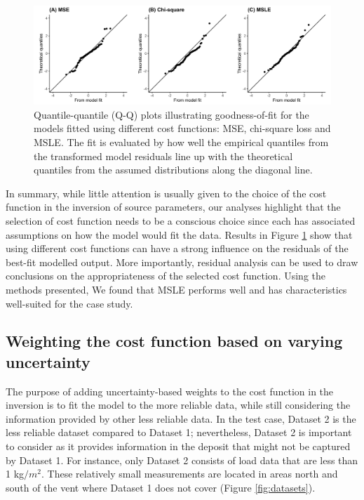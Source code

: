     \begin{figure}[tbp]
    \centering
    \includegraphics[width=\linewidth]{Figures/fig5_qq-plots.png}
    \caption{Quantile-quantile (Q-Q) plots illustrating goodness-of-fit for the models fitted using different cost functions: MSE, chi-square loss and MSLE. The fit is evaluated by how well the empirical quantiles from the transformed model residuals line up with the theoretical quantiles from the assumed distributions along the diagonal line.}
    \label{fig:gaussian_qq}
    \end{figure}

In summary, while little attention is usually given to the choice of the cost function in the inversion of source parameters, our analyses highlight that the selection of cost function needs to be a conscious choice since each has associated assumptions on how the model would fit the data. Results in Figure \ref{fig:gaussian_qq} show that using different cost functions can have a strong influence on the residuals of the best-fit modelled output. More importantly, residual analysis can be used to draw conclusions on the appropriateness of the selected cost function. Using the methods presented, We found that MSLE performs well and has characteristics well-suited for the case study. 

\subsection{Weighting the cost function based on varying uncertainty} \label{subsection-varuncert}

The purpose of adding uncertainty-based weights to the cost function in the inversion is to fit the model to the more reliable data, while still considering the information provided by other less reliable data. In the test case, Dataset 2 is the less reliable dataset compared to Dataset 1; nevertheless, Dataset 2 is important to consider as it provides information in the deposit that might not be captured by Dataset 1. For instance, only Dataset 2 consists of load data that are less than 1 kg$/m^{2}$. These relatively small measurements are located in areas north and south of the vent where Dataset 1 does not cover (Figure \ref{fig:datasets}). 

